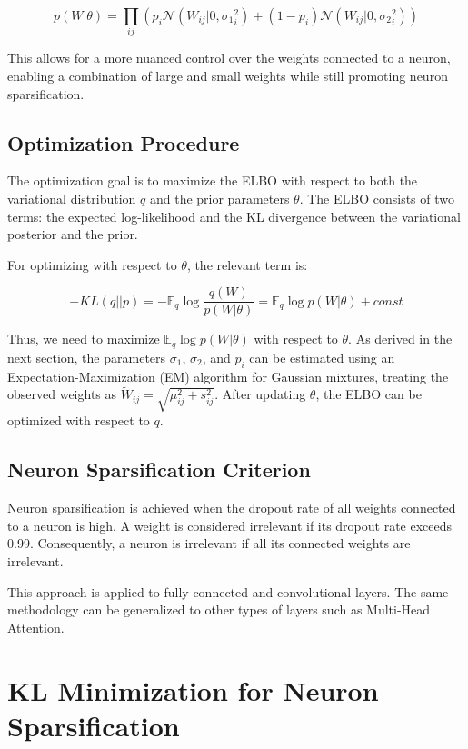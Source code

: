 \documentclass{article}
\newcommand{\N}{\mathcal{N}}
\newcommand{\E}{\mathbb{E}}
\begin{document}
\begin{equation}
    p(W|\theta) = \prod_{ij} \left( p_i \N(W_{ij}|0, {\sigma_1}_i^2) + (1 - p_i)\N(W_{ij}|0, {\sigma_2}_i^2) \right)
\end{equation}

This allows for a more nuanced control over the weights connected to a neuron, enabling a combination of large and small weights while still promoting neuron sparsification.

\subsection{Optimization Procedure}
The optimization goal is to maximize the ELBO with respect to both the variational distribution $q$ and the prior parameters $\theta$. The ELBO consists of two terms: the expected log-likelihood and the KL divergence between the variational posterior and the prior.

For optimizing with respect to $\theta$, the relevant term is:

\begin{equation}
    -KL(q || p) = - \E_q \log \frac{q(W)}{p(W|\theta)} = \E_q \log p(W|\theta) + const
\end{equation}

Thus, we need to maximize $\E_q \log p(W|\theta)$ with respect to $\theta$. As derived in the next section, the parameters $\sigma_1$, $\sigma_2$, and $p_i$ can be estimated using an Expectation-Maximization (EM) algorithm for Gaussian mixtures, treating the observed weights as $\tilde{W}_{ij} = \sqrt{\mu_{ij}^2 + s_{ij}^2}$. After updating $\theta$, the ELBO can be optimized with respect to $q$.

\subsection{Neuron Sparsification Criterion}
Neuron sparsification is achieved when the dropout rate of all weights connected to a neuron is high. A weight is considered irrelevant if its dropout rate exceeds 0.99. Consequently, a neuron is irrelevant if all its connected weights are irrelevant.

This approach is applied to fully connected and convolutional layers. The same methodology can be generalized to other types of layers such as Multi-Head Attention.

\section{KL Minimization for Neuron Sparsification}
\end{document}
